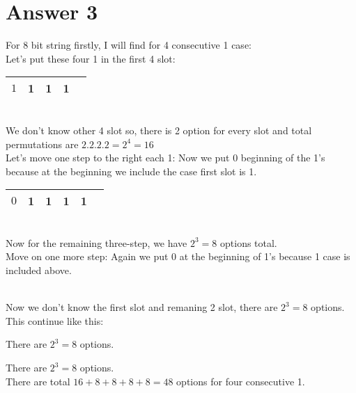 \documentclass[12pt]{article}
\begin{document}
\section*{Answer 3}
For 8 bit string firstly, I will find for 4 consecutive 1 case:\\
Let's put these four 1 in the first 4 slot:
\begin{tabular}{|c|c|c|c|c}
    \hline
         $1$ & 1 & 1 & 1 & \\ \hline
    \end{tabular}\\
We don't know other 4 slot so, there is 2 option for every slot and total permutations are $2.2.2.2=2^4 =16$\\
Let's move one step to the right each 1: Now we put 0 beginning of the 1's because at the beginning we include the case first slot is 1. \\
\begin{tabular}{|c|c|c|c|c|c}
    \hline
         $0$ & 1 & 1 & 1 & 1 & \\ \hline
    \end{tabular}\\
    Now for the remaining three-step, we have $2^3 =8$ options total.\\
Move on one more step: Again we put 0 at the beginning of 1's because 1 case is included above.
\\
    Now we don't know the first slot and remaning 2 slot, there are $2^3 = 8$ options.\\
    This continue like this:\\
     There are $2^3 = 8$ options.\\
    
     There are $2^3 = 8$ options.\\

    There are total $16+8+8+8+8 = 48$ options for four consecutive 1.\\
    
\end{document}
